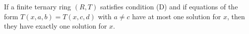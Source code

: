 If a finite ternary ring $(R, T)$ satisfies condition (D) and if equations of the form $T(x, a, b) = T(x, c, d)$ with $a \neq c$ have at most one solution for $x$, then they have exactly one solution for $x$.
